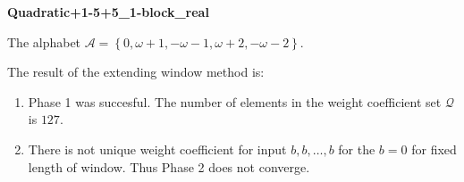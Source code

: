 \begin{exmp}
\textbf{ Quadratic+1-5+5\_1-block\_real }

\label{ex:Quadratic+1-5+51-blockreal}

The alphabet $\mathcal{A} =\left\{0, \omega + 1, -\omega - 1, \omega + 2, -\omega - 2\right\}$.

The result of the extending window method is:
\begin{enumerate}
    \item Phase 1 was succesful.
The number of elements in the weight coefficient set $\mathcal{Q}$ is $127$.

    \item There is not unique weight coefficient for input $b,b,\dots,b$ for the $b= 0 $ for fixed length of window. Thus Phase 2 does not converge.

\end{enumerate}
\end{exmp}
